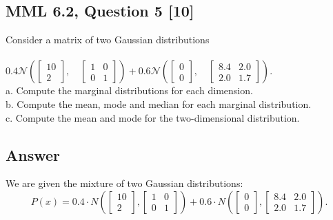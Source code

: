 \documentclass[12pt]{article}
\begin{document}
\subsection*{MML 6.2, Question 5 [10]}
Consider a matrix of two Gaussian distributions\\\\
\begin{math}
0.4\mathcal{N} \left( \begin{bmatrix} 10 \\ 2 \end{bmatrix}, \quad \begin{bmatrix} 1 & 0 \\ 0 & 1 \end{bmatrix} \right) + 0.6\mathcal{N} \left( \begin{bmatrix} 0 \\ 0 \end{bmatrix}, \quad \begin{bmatrix} 8.4 & 2.0 \\ 2.0 & 1.7 \end{bmatrix} \right).
\end{math}
\\

a. Compute the marginal distributions for each dimension.\\
b. Compute the mean, mode and median for each marginal distribution.\\
c. Compute the mean and mode for the two-dimensional distribution.\\
\subsection*{Answer}


We are given the mixture of two Gaussian distributions:
\[
P(x) = 0.4 \cdot N \left( \begin{bmatrix} 10 \\ 2 \end{bmatrix}, \begin{bmatrix} 1 & 0 \\ 0 & 1 \end{bmatrix} \right) + 0.6 \cdot N \left( \begin{bmatrix} 0 \\ 0 \end{bmatrix}, \begin{bmatrix} 8.4 & 2.0 \\ 2.0 & 1.7 \end{bmatrix} \right).
\]
\end{document}
